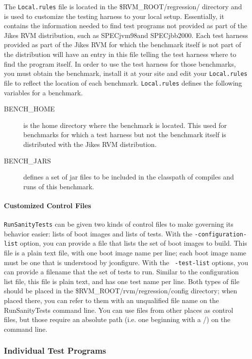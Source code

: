  The {\tt Local.rules} file is located in the \$RVM\_ROOT/regression/
directory and is used to customize the testing harness to your local
setup.  Essentially, it contains the information needed to find test
programs not provided as part of the Jikes RVM distribution, such as
SPECjvm98\trademark and SPECjbb2000\trademark.  Each test harness
provided as part of the Jikes RVM for which the benchmark itself is
not part of the distribution will have an entry in this file telling
the test harness where to find the program itself.  In order to use
the test harness for those benchmarks, you must obtain the benchmark,
install it at your site and edit your {\tt{Local.rules}} file to
reflect the location of each benchmark.  {\tt{Local.rules}} defines
the following variables for a benchmark.
\begin{description}
\item[BENCH\_HOME] is the home directory where the benchmark is
located.  This used for benchmarks for which a test harness but not
the benchmark itself is distributed with the Jikes RVM distribution. 
\item[BENCH\_JARS] defines a set of jar files to be included in the
classpath of compiles and runs of this benchmark.
\end{description}

\paragraph{Customized Control Files}

 {\tt{RunSanityTests}} can be given two kinds of control files to make
governing its behavior easier: lists of boot images and lists of
tests.  With the {\tt -configuration-list} option, you can provide a
file that lists the set of boot images to build.  This file is a plain
text file, with one boot image name per line; each boot image name
must be one that is understood by jconfigure.  With the {\tt
-test-list} options, you can provide a filename that the set of tests
to run.  Similar to the configuration list file, this file is plain
text, and has one test name per line.  Both types of file should be
placed in the \$RVM\_ROOT/rvm/regression/config directory; when placed
there, you can refer to them with an unqualified file name on the
RunSanityTests command line.  You can use files from other places as
control files, but those require an absolute path (i.e. one beginning
with a /) on the command line.


\subsubsection{Individual Test Programs}

